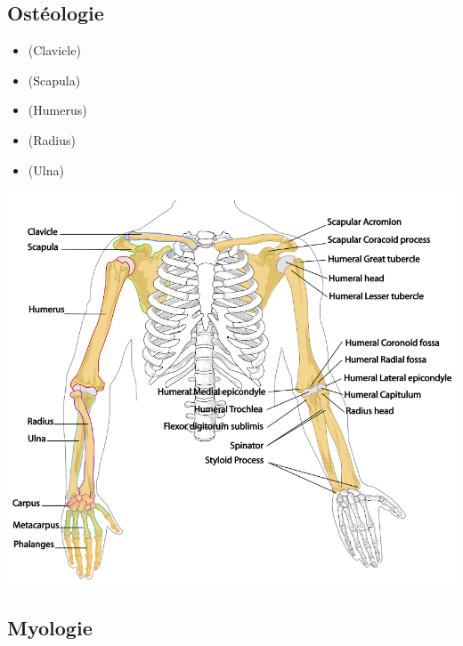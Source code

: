 \documentclass[pdftex,a4paper,11pt]{report}
\numberwithin{equation}{subsection}
\begin{document}
\subsection{Ostéologie}

\begin{itemize}
    \item (Clavicle)
    \item (Scapula)
    \item (Humerus)
    \item (Radius)
    \item (Ulna)
\end{itemize}

\begin{center}
        \includegraphics[width=.80\linewidth]{fig/Human_arm_bones_diagram}
\end{center}

\subsection{Myologie}
\end{document}
